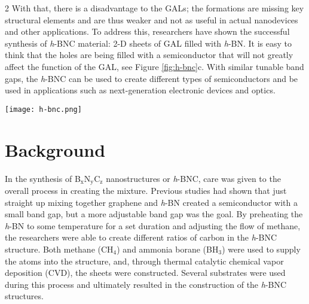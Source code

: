 \documentclass[11pt]{article}
\newcommand{\sub}[1]{\ensuremath{_{\textrm{#1}}}}
\begin{document}
\begin{multicols}{2}
With that, there is a disadvantage to the GALs; the formations are missing key structural elements and are thus weaker and not as useful in actual nanodevices and other applications. To address this, researchers have shown the successful synthesis of \textit{h}-BNC material: 2-D sheets of GAL filled with \textit{h}-BN.\cite{synth} It is easy to think that the holes are being filled with a semiconductor that will not greatly affect the function of the GAL, see Figure \ref{fig:h-bnc}c. With similar tunable band gaps, the \textit{h}-BNC can be used to create different types of semiconductors and be used in applications such as next-generation electronic devices and optics.\cite{main,synth}

\begin{figure*}
\begin{center}
    \texttt{[image: h-bnc.png]}
  \caption{Different lattice formations: a. graphene antidot lattice (GAL),\cite{qubit} b. \textit{h}-BN,\cite{bn} c. experimental hypothesized \textit{h}-BNC,\cite{synth} and d. theoretical \textit{h}-BNC.\cite{main}}
  \label{fig:h-bnc}
\end{center}
\end{figure*}



\section{\textbf{Background}}
In the synthesis of B\sub{x}N\sub{y}C\sub{z} nanostructures or \textit{h}-BNC, care was given to the overall process in creating the mixture. Previous studies had shown that just straight up mixing together graphene and \textit{h}-BN created a semiconductor with a small band gap, but a more adjustable band gap was the goal. By preheating the \textit{h}-BN to some temperature for a set duration and adjusting the flow of methane, the researchers were able to create different ratios of carbon in the \textit{h}-BNC structure.\cite{synth} Both methane (CH\sub{4}) and ammonia borane (BH\sub{3}) were used to supply the atoms into the structure, and, through thermal catalytic chemical vapor deposition (CVD), the sheets were constructed.\cite{synth} Several substrates were used during this process and ultimately resulted in the construction of the \textit{h}-BNC structures. \\ \\


\end{multicols}
\end{document}
